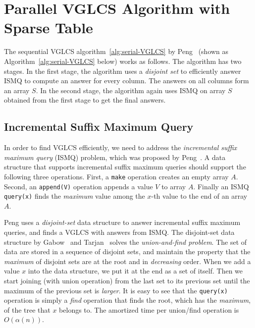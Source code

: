 \section{Parallel VGLCS Algorithm with Sparse Table} %
\label{sec:parallelVGLCS}


The sequential VGLCS algorithm~\ref{alg:serial-VGLCS} by
Peng~\cite{Peng2011TheLC} (shown as Algorithm~\ref{alg:serial-VGLCS}
below) works as follows.  The algorithm has two stages.  In the first
stage, the algorithm uses a {\em disjoint set} to efficiently answer
ISMQ to compute an answer for every column.  The answers on all
columns form an array $S$.  In the second stage, the algorithm again
uses ISMQ on array $S$ obtained from the first stage to get the final
answers.




\subsection{Incremental Suffix Maximum Query}

In order to find VGLCS efficiently, we need to address the {\em
  incremental suffix maximum query} (ISMQ) problem, which was proposed
by Peng~\cite{Peng2011TheLC}.  A data structure that supports
incremental suffix maximum queries should support the following three
operations.  First, a {\tt make} operation creates an empty array $A$.
Second, an {\tt append(V)} operation appends a value $V$ to array $A$.
Finally an ISMQ {\tt query(x)} finds the {\em maximum} value among the
$x$-th value to the end of an array $A$.



Peng uses a {\em disjoint-set} data structure to answer incremental
suffix maximum queries, and finds a VGLCS with answers from ISMQ. The
disjoint-set data structure by Gabow~\cite{Gabow1983ALA} and
Tarjan~\cite{Tarjan1975EfficiencyOA} solves the {\em union-and-find
  problem}.  The set of data are stored in a sequence of disjoint
sets, and maintain the property that the {\em maximum} of disjoint
sets are at the root and in {\em decreasing} order.  When we add a
value $x$ into the data structure, we put it at the end as a set of
itself.  Then we start joining (with union operation) from the last
set to its previous set until the maximum of the previous set is {\em
  larger}.  It is easy to see that the {\tt query(x)} operation is
simply a {\em find} operation that finds the root, which has the {\em
  maximum}, of the tree that $x$ belongs to.  The amortized time per
union/find operation is $O(\alpha(n))$.

